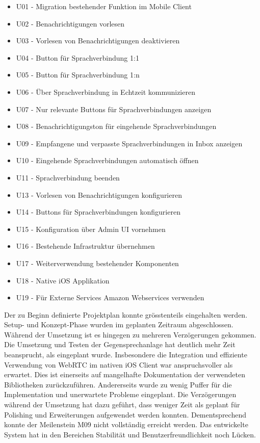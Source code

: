 \begin{itemize}
    \item U01 - Migration bestehender Funktion im Mobile Client
    \item U02 - Benachrichtigungen vorlesen
    \item U03 - Vorlesen von Benachrichtigungen deaktivieren
    \item U04 - Button für Sprachverbindung 1:1
    \item U05 - Button für Sprachverbindung 1:n
    \item U06 - Über Sprachverbindung in Echtzeit kommunizieren
    \item U07 - Nur relevante Buttons für Sprachverbindungen anzeigen
    \item U08 - Benachrichtigungston für eingehende Sprachverbindungen
    \item U09 - Empfangene und verpasste Sprachverbindungen in Inbox anzeigen
    \item U10 - Eingehende Sprachverbindungen automatisch öffnen
    \item U11 - Sprachverbindung beenden
    \item U13 - Vorlesen von Benachrichtigungen konfigurieren
    \item U14 - Buttons für Sprachverbindungen konfigurieren
    \item U15 - Konfiguration über Admin UI vornehmen
    \item U16 - Bestehende Infrastruktur übernehmen
    \item U17 - Weiterverwendung bestehender Komponenten
    \item U18 - Native iOS Applikation
    \item U19 - Für Externe Services Amazon Webservices verwenden
\end{itemize}

Der zu Beginn definierte Projektplan konnte grösstenteils eingehalten werden.
Setup- und Konzept-Phase wurden im geplanten Zeitraum abgeschlossen.
Während der Umsetzung ist es hingegen zu mehreren Verzögerungen gekommen.
Die Umsetzung und Testen der Gegensprechanlage hat deutlich mehr Zeit beansprucht, als eingeplant wurde.
Insbesondere die Integration und effiziente Verwendung von WebRTC im nativen iOS Client war anspruchsvoller als erwartet.
Dies ist einerseits auf mangelhafte Dokumentation der verwendeten Bibliotheken zurückzuführen.
Andererseits wurde zu wenig Puffer für die Implementation und unerwartete Probleme eingeplant.
Die Verzögerungen während der Umsetzung hat dazu geführt, dass weniger Zeit als geplant für Polishing und Erweiterungen aufgewendet werden konnten.
Dementsprechend konnte der Meilenstein M09 nicht vollständig erreicht werden.
Das entwickelte System hat in den Bereichen Stabilität und Benutzerfreundlichkeit noch Lücken.

